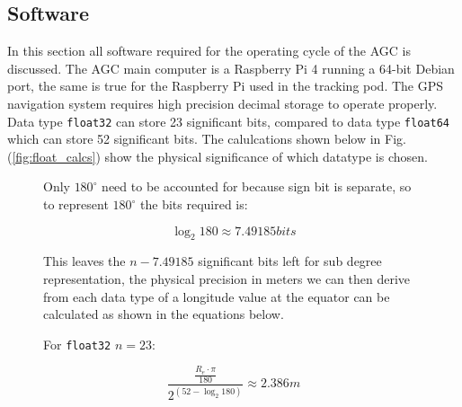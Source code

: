 \documentclass[11pt,landscape]{article}
\begin{document}
\newpage
\begin{multicols}{3}
\section{Software}
\label{software}
In this section all software required for the operating cycle of the AGC is
discussed. The AGC main computer is a Raspberry Pi 4 running a 64-bit Debian
port, the same is true for the Raspberry Pi used in the tracking pod. The GPS
navigation system requires high precision decimal storage to operate properly.
Data type \verb|float32| can store 23 significant bits, compared to data type
\verb|float64| which can store 52 significant
bits\cite{floating_point_goldberg}. The calulcations shown below in Fig.
(\ref{fig:float_calcs}) show the physical significance of which datatype is
chosen.
\begin{figure}[H]
    \begin{mdframed}
        Only $180^{\circ}$ need to be accounted for because sign bit is
        separate, so to represent $180^{\circ}$ the bits required is:
        \begin{center}
            \begin{equation*}
                \log_2{180} \approx 7.49185 bits
            \end{equation*}
        \end{center}
        This leaves the $n - 7.49185$ significant bits left for sub degree
        representation, the physical precision in meters we can then derive from
        each data type of a longitude value at the equator can be calculated as
        shown in the equations below.\newline
        \begin{center}
            \begin{minipage}{0.45\textwidth}
                \begin{mdframed}
                    For \verb|float32| $n=23$:
                    \begin{center}
                        \begin{equation*}
                            \frac{\frac{R_e \cdot \pi}{180}}{2^{\left(52 - \log_2{180}\right)}} \approx 2.386m
                            \label{eq}
                        \end{equation*}
                    \end{center}
                \end{mdframed}
                \end{minipage}

\end{center}
\end{mdframed}
\end{figure}
\end{multicols}
\end{document}
